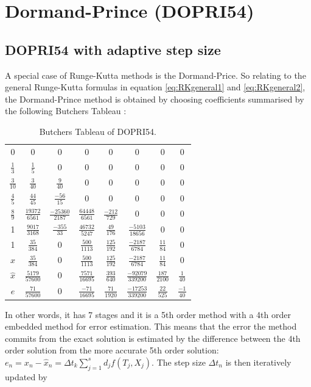 \section{Dormand-Prince (DOPRI54)}
\subsection{DOPRI54 with adaptive step size}
A special case of Runge-Kutta methods is the Dormand-Price. So relating to the general Runge-Kutta formulas in equation \ref{eq:RKgeneral1} and \ref{eq:RKgeneral2}, the Dormand-Prince method is obtained by choosing coefficients summarised by the following Butchers Tableau \cite{JrgensenRunge-KuttaEquations}:

\begin{table}[H]
\label{tab:DOPRI54}
\centering
\begin{tabular}{c|ccccccc}
0 & 0 & 0 & 0 & 0 & 0 & 0 & 0 \\
$\frac{1}{3}$ & $\frac{1}{5}$ & 0 & 0 & 0 & 0 & 0 & 0 \\
$\frac{3}{10}$ & $\frac{3}{40}$ & $\frac{9}{40}$ & 0 & 0 & 0 & 0 & 0 \\
$\frac{4}{5}$ & $\frac{44}{45}$ & $\frac{-56}{15}$ & 0 & 0 & 0 & 0 & 0 \\
$\frac{8}{9}$ & $\frac{19372}{6561}$ & $\frac{-25360}{2187}$ & $\frac{64448}{6561}$ & $\frac{-212}{729}$ & 0 & 0 & 0 \\
1 & $\frac{9017}{3168}$ & $\frac{-355}{33}$ & $\frac{46732}{5247}$ & $\frac{49}{176}$ & $\frac{-5103}{18656}$ & 0 & 0 \\
1 & $\frac{35}{384}$ & 0 & $\frac{500}{1113}$ & $\frac{125}{192}$ & $\frac{-2187}{6784}$ & $\frac{11}{84}$ & 0 \\ \hline
 $x$ &  $\frac{35}{384}$ & 0 & $\frac{500}{1113}$ & $\frac{125}{192}$ & $\frac{-2187}{6784}$ & $\frac{11}{84}$ & 0  \\
$\hat{x}$ & $\frac{5179}{57600}$ & 0 & $\frac{7571}{16695}$ & $\frac{393}{640}$ & $\frac{-92079}{339200}$ & $\frac{187}{2100}$ & $\frac{1}{40}$ \\ \hline
$e$ & $\frac{71}{57600}$ & 0 & $\frac{-71}{16695}$ & $\frac{71}{1920}$ & $\frac{-17253}{339200}$ & $\frac{22}{525}$ & $\frac{-1}{40}$
\end{tabular}%
\caption{Butchers Tableau of DOPRI54.}
\end{table}

In other words, it has 7 stages and it is a 5th order method with a 4th order embedded method for error estimation. This means that the error the method commits from the exact solution is estimated by the difference between the 4th order solution from the more accurate 5th order solution: $e_n = x_n - \hat{x}_n = \Delta t_k \sum_{j=1}^{s} d_{j} f\left(T_{j}, X_{j}\right)$. The step size $\Delta t_n$ is then iteratively updated by

